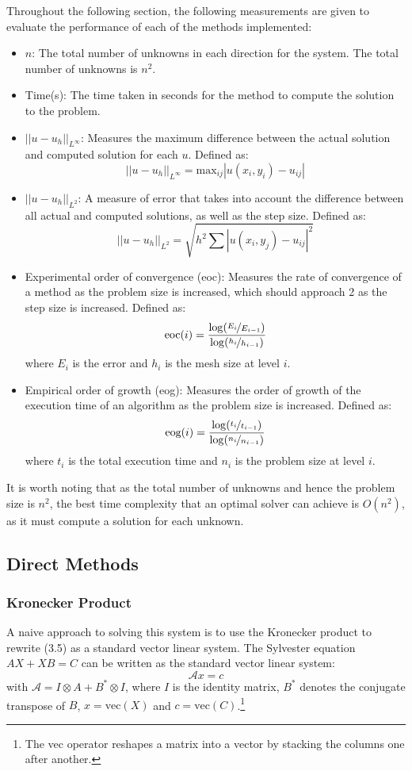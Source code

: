 \documentclass{article}
\numberwithin{equation}{section}
\begin{document}
Throughout the following section, the following measurements are given to evaluate the performance of each of the methods implemented:
\begin{itemize}
\item $n$: The total number of unknowns in each direction for the system. The total number of unknowns is $n^2$.
\item Time(s): The time taken in seconds for the method to compute the solution to the problem.
\item $|| u - u_h ||_{L^\infty} $: Measures the maximum difference between the actual solution and computed solution for each $u$. Defined as:
 \[ || u - u_h ||_{L^\infty} = \text{max}_{ij} | u(x_i, y_i) - u_{ij} | \]
\item $|| u - u_h ||_{L^2} $: A measure of error that takes into account the difference between all actual and computed solutions, as well as the step size. Defined as:
\[ || u - u_h ||_{L^2} = \sqrt{h^2 \sum | u(x_i,y_j) - u_{ij} |^2} \]
\item Experimental order of convergence (eoc): Measures the rate of convergence of a method as the problem size is increased, which should approach 2 as the step size is increased. Defined as:
\[ \text{eoc}(i) = \frac{\log(\nicefrac{E_i}{E_{i-1}})}{\log(\nicefrac{h_i}{h_{i-1}})} \]
where $E_i$ is the error and $h_i$ is the mesh size at level $i$. 
\item Empirical order of growth (eog): Measures the order of growth of the execution time of an algorithm as the problem size is increased. Defined as:
\[ \text{eog}(i) = \frac{\log(\nicefrac{t_{i}}{t_{i-1}})}{\log(\nicefrac{n_{i}}{n_{i-1}})} \]
where $t_i$ is the total execution time and $n_i$ is the problem size at level $i$.
\end{itemize}

It is worth noting that as the total number of unknowns and hence the problem size is $n^2$, the best time complexity that an optimal solver can achieve is $O(n^2)$, as it must compute a solution for each unknown. 

\subsection{Direct Methods}

\subsubsection{Kronecker Product}
A naive approach to solving this system is to use the Kronecker product to rewrite (3.5) as a standard vector linear system. The Sylvester equation $AX + XB = C$ can be written as the standard vector linear system:
\begin{equation}
\mathcal{A}x = c
\end{equation}
with $\mathcal{A} = I \otimes A + B^* \otimes I$, where $I$ is the identity matrix, $B^*$ denotes the conjugate transpose of $B$, $x = \text{vec}(X)$ and $c = \text{vec}(C)$.\footnote{The vec operator reshapes a matrix into a vector by stacking the columns one after another.}
\end{document}

